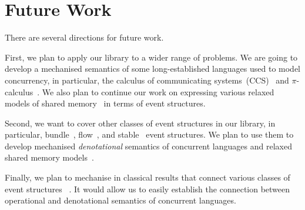 \section{Future Work}

There are several directions for future work. 

First, we plan to apply our library to a wider range of problems. 
We are going to develop a mechanised semantics of some long-established
languages used to model concurrency, in particular,
the calculus of communicating systems~(CCS)~\cite{Milner:80} and 
$\pi$-calculus~\cite{Milner:99}.      
We also plan to continue our work on 
expressing various relaxed models 
of shared memory~\cite{Lahav-al:POPL16, Lahav-al:PLDI17, Podkopaev-al:POPL19}
in terms of event structures.  

Second, we want to cover other classes of event structures in our library, 
in particular, bundle~\cite{Langerak:91}, flow~\cite{Boudol-Castellani:1991},
and stable~\cite{Winskel:82, Winskel:86} event structures.
We plan to use them to develop mechanised \emph{denotational} semantics 
of concurrent languages and relaxed shared memory models~\cite{Dodds-al:ESOP18}.  

Finally, we plan to mechanise in \coq classical results 
that connect various classes of event structures%
~\cite{Nielsen-al:1981, Boudol-Castellani:1991}. 
It would allow us to easily establish the connection between operational and denotational 
semantics of concurrent languages.
